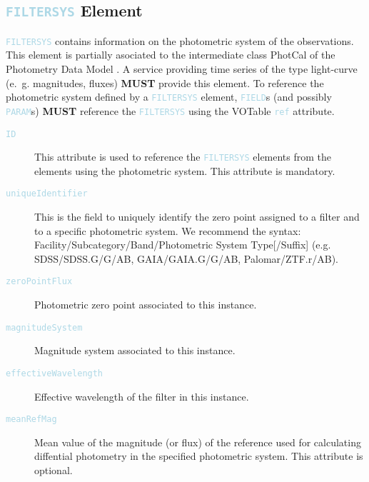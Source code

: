 \documentclass[11pt,a4paper]{ivoa}
\newcommand\elem[1]{\textcolor{LightBlue}{{\tt#1}}}
\begin{document}
\subsection{\elem{FILTERSYS} Element}
\elem{FILTERSYS} contains information on the photometric system of the observations. This element is partially asociated to the intermediate class PhotCal of the Photometry Data Model \cite{PhotometryDM}. A service providing time series of the type light-curve (e.~g. magnitudes, fluxes) \textbf{MUST} provide this element. To reference the photometric system defined by a \elem{FILTERSYS} element, \elem{FIELD}s (and possibly \elem{PARAM}s) \textbf{MUST} reference the \elem{FILTERSYS} using the VOTable \elem{ref} attribute. 
\begin{description}
     \item[\elem{ID}] This attribute is used to reference the \elem{FILTERSYS} elements from the elements using the photometric system. This attribute is mandatory. 
     \item[\elem{uniqueIdentifier}] This is the field to uniquely identify the zero point assigned to a filter and to a specific photometric system. We recommend the syntax: Facility/Subcategory/Band/Photometric System Type[/Suffix] (e.g. SDSS/SDSS.G/G/AB, GAIA/GAIA.G/G/AB, Palomar/ZTF.r/AB). 
     \item[\elem{zeroPointFlux}] Photometric zero point associated to this instance. 
     \item[\elem{magnitudeSystem}] Magnitude system associated to this instance.
     \item[\elem{effectiveWavelength}] Effective wavelength of the filter in this instance. 
     \item[\elem{meanRefMag}] Mean value of the magnitude (or flux) of the reference used for calculating diffential photometry in the specified photometric system. This attribute is optional.  
\end{description}
\end{document}
